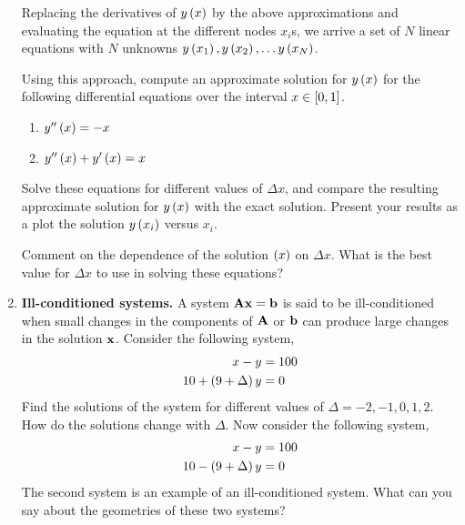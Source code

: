 \documentclass[12pt]{article}
\def\mf{\ensuremath\mathbf}
\def\lp{\ensuremath\left(}
\def\rp{\ensuremath\right)}
\def\ls{\ensuremath\left[}
\def\rs{\ensuremath\right]}
\newcommand{\ct}[1]{\lp #1\rp}
\newcommand{\dt}[1]{\ls #1\rs}
\begin{document}
\begin{enumerate}
Replacing the derivatives of $y\ct{x}$ by the above approximations and evaluating the equation at the different nodes $x_i$s, we arrive a set of $N$ linear equations with $N$ unknowns $y\ct{x_1}, y\ct{x_2}, \ldots y\ct{x_N}$. 

Using this approach, compute an approximate solution for $y\ct{x}$ for the following differential equations over the interval $x \in \dt{0, 1}$. 
\begin{enumerate}
        \item $y''\ct{x} = -x$
        \item $y''\ct{x} + y'\ct{x} = x$
\end{enumerate}
Solve these equations for different values of $\Delta x$, and compare the resulting approximate solution for $y\ct{x}$ with the exact solution.   Present your results as a plot the solution $y\ct{x_i}$ versus $x_i$.

Comment on the dependence of the solution $\ct{x}$ on $\Delta x$. What is the best value for $\Delta x$ to use in solving these equations?

\item \label{matrices:uncertain} \textbf{Ill-conditioned systems.} A system $\mf{A}\mf{x} = \mf{b}$ is said to be ill-conditioned when small changes in the components of $\mf{A}$ or $\mf{b}$ can produce large changes in the solution $\mf{x}$. Consider the following system,
\begin{align}
x - y &= 100 \nonumber \\
10 + \ct{9 + \Delta}y &= 0 \nonumber
\end{align}
Find the solutions of the system for different values of $\Delta = -2, -1, 0, 1, 2$. How do the solutions change with $\Delta$. Now consider the following system,
\begin{align}
x - y &= 100 \nonumber \\
10 - \ct{9 + \Delta}y &= 0 \nonumber
\end{align}
The second system is an example of an ill-conditioned system. What can you say about the geometries of these two systems?


\end{enumerate}
\end{document}
